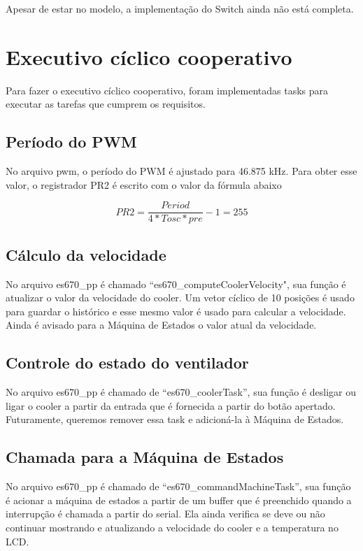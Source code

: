 \documentclass{article}
\begin{document}
Apesar de estar no modelo, a implementação do Switch ainda não está completa.

\section{Executivo cíclico cooperativo}

Para fazer o executivo cíclico cooperativo, foram implementadas tasks para executar as tarefas que cumprem os requisitos.

\subsection{Período do PWM}
No arquivo pwm, o período do PWM é ajustado para 46.875 kHz. Para obter esse valor, o registrador PR2 é escrito com o valor da fórmula abaixo

\begin{equation}
PR2 = \frac{Period}{4*Tosc*pre}-1 = 255
\end{equation}

\subsection{Cálculo da velocidade}
No arquivo es670\_pp é chamado ``es670\_computeCoolerVelocity", sua função é atualizar o valor da velocidade do cooler. Um vetor cíclico de 10 posições é usado para guardar o histórico e esse mesmo valor é usado para calcular a velocidade. Ainda é avisado para a Máquina de Estados o valor atual da velocidade.

\subsection{Controle do estado do ventilador}
No arquivo es670\_pp é chamado de ``es670\_coolerTask'', sua função é desligar ou ligar o cooler a partir da entrada que é fornecida a partir do botão apertado.
Futuramente, queremos remover essa task e adicioná-la à Máquina de Estados.

\subsection{Chamada para a Máquina de Estados}
No arquivo es670\_pp é chamado de ``es670\_commandMachineTask'', sua função é acionar a máquina de estados a partir de um buffer que é preenchido quando a interrupção é chamada a partir do serial. Ela ainda verifica se deve ou não continuar mostrando e atualizando a velocidade do cooler e a temperatura no LCD.
\end{document}
